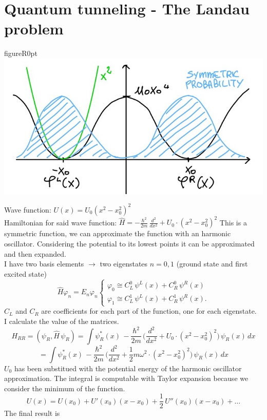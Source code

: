\section{Quantum tunneling - The Landau problem}
\begin{wrapfloat}{figure}{R}{0pt}
	\includegraphics[scale=0.20]{img_2.jpg}
\end{wrapfloat}
Wave function: $U(x)=U_0(x^2-x_0^2)^2$\\
Hamiltonian for said wave function: $\hat{H}=-\frac{\hbar^2}{2m}\,\frac{d^2}{dx^2}+U_0\cdot(x^2-x_0^2)^2$
This is a symmetric function, we can approximate the function with an harmonic oscillator. Considering the potential to its lowest points it can be approximated and then expanded. \\
I have two basis elements $\rightarrow$ two eigenstates $n=0,1$ (ground state and first excited state)
\[
\hat{H}\varphi_n=E_n\varphi_n
\begin{cases}
\varphi_0 \cong C_L^0\,\psi^L(x)+C_R^0\,\psi^R(x)\\
\varphi_1 \cong C_L^1\,\psi^L(x)+C_R^1\,\psi^R(x).
\end{cases}
\]
$C_L$ and $C_R$ are coefficients for each part of the function, one for each eigenstate.\\
I calculate the value of the matrices.\\
\[
H_{RR}=(\psi_R,\hat{H}\,\psi_R)= \int\psi_R^*(x)\,-\frac{\hbar^2}{2m}\,\bigg(\frac{d^2}{dx^2}+U_0\cdot(x^2-x_0^2)^2\bigg)\,\psi_R(x)\,dx\]
\[
=\int\psi_R^*(x)\,-\frac{\hbar^2}{2m}\,\bigg  (\frac{d^2}{dx^2}+\frac{1}{2}m\omega^2\cdot(x^2-x_0^2)^2\bigg)\,\psi_R(x)\,dx
\]
$U_0$ has been substitued with the potential energy of the harmonic oscillator approximation. The integral is computable with Taylor expansion because we consider the minimum of the function.
\[
U(x)=U(x_0)+U'(x_0)(x-x_0)+\frac{1}{2}\,U''(x_0)(x-x_0)+\dots\]
The final result is
